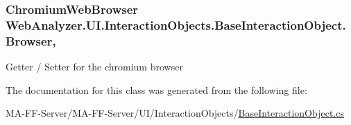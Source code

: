 \subsubsection[{Browser}]{\setlength{\rightskip}{0pt plus 5cm}Chromium\+Web\+Browser Web\+Analyzer.\+U\+I.\+Interaction\+Objects.\+Base\+Interaction\+Object.\+Browser\hspace{0.3cm}{\ttfamily [get]}, {\ttfamily [set]}}\label{class_web_analyzer_1_1_u_i_1_1_interaction_objects_1_1_base_interaction_object_aac4f2f8441547dc677f700485c295259}


Getter / Setter for the chromium browser 



The documentation for this class was generated from the following file\+:\begin{DoxyCompactItemize}
\item 
M\+A-\/\+F\+F-\/\+Server/\+M\+A-\/\+F\+F-\/\+Server/\+U\+I/\+Interaction\+Objects/\hyperlink{_base_interaction_object_8cs}{Base\+Interaction\+Object.\+cs}\end{DoxyCompactItemize}
